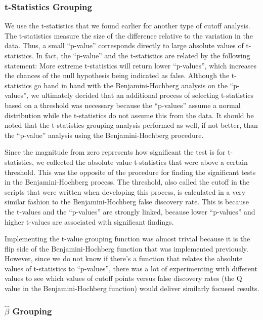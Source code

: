 \subsubsection{t-Statistics Grouping}

\par We use the t-statistics that we found earlier for another type of cutoff
analysis. The t-statistics measure the size of the difference relative to the 
variation in the data. Thus, a small ``p-value'' corresponds directly to large
absolute values of t-statistics. In fact, the ``p-value'' and the t-statistics
are related by the following statement: More extreme t-statistics will return 
lower ``p-values'', which increases the chances of the null hypothesis being 
indicated as false. Although the t-statistics go hand in hand with the 
Benjamini-Hochberg analysis on the ``p-values'', we ultimately decided that an 
additional process of selecting t-statistics based on a threshold was 
necessary because the ``p-values'' assume a normal distribution while the 
t-statistics do not assume this from the data. It should be noted that the 
t-statistics grouping analysis performed as well, if not better, than the 
``p-value'' analysis using the Benjamini-Hochberg procedure.

\par Since the magnitude from zero represents how significant the test is for
t-statistics, we collected the absolute value t-statistics that were above a 
certain threshold. This was the opposite of the procedure for finding the 
significant tests in the Benjamini-Hochberg process. The threshold, also called
the cutoff in the scripts that were written when developing this process, is 
calculated in a very similar fashion to the Benjamini-Hochberg false discovery 
rate. This is because the t-values and the ``p-values'' are strongly linked,
because lower ``p-values'' and higher t-values are associated with significant 
findings. 

\par Implementing the t-value grouping function was almost trivial because it 
is the flip side of the Benjamini-Hochberg function that was implemented 
previously. However, since we do not know if there's a function that relates 
the absolute values of t-statistics to ``p-values'', there was a lot of 
experimenting with different values to see which values of cutoff points versus
false discovery rates (the Q value in the Benjamini-Hochberg function) would 
deliver similarly focused results.

\subsubsection{$\hat{\beta}$ Grouping}

